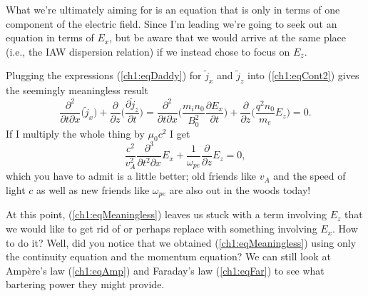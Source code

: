 What we're ultimately aiming for is an equation that is only in terms
of one component of the electric field. Since I'm leading we're going to seek
out an equation in terms of $E_x$, but be aware that we would arrive at the same
place (i.e., the IAW dispersion relation) if we instead chose to focus on $E_z$.

Plugging the expressions (\ref{ch1:eqDaddy}) for $\tilde j_x$ and $\tilde j_z$
into (\ref{ch1:eqCont2}) gives the seemingly meaningless result
\begin{equation*}
    \dfrac{\partial^2}{\partial t \partial x} \Big( \tilde j_x \Big) + \dfrac{\partial}{\partial z}
    \Big( \dfrac{\partial \tilde j_z}{\partial t} \Big) = \dfrac{\partial^2}{\partial
      t \partial x} \Big(\dfrac{m_i n_0 }{B_0^2}\dfrac{\partial E_x}{\partial t} \Big) +
    \dfrac{\partial}{\partial z} \Big( \dfrac{q^2 n_0}{m_e} E_z \Big) = 0.
\end{equation*}
If I multiply the whole thing by $\mu_0 c^2$ I get 
\begin{equation} \label{ch1:eqMeaningless}
  \dfrac{c^2}{v_A^2}\dfrac{\partial^3 }{\partial t^2 \partial x} E_x + \dfrac{1}{\omega_{pe}}\dfrac{\partial}{\partial z} E_z = 0,
\end{equation}
which you have to admit is a little better; old friends like $v_A$ and the speed
of light $c$ as well as new friends like $\omega_{pe}$ are also out in the woods
today!

At this point, (\ref{ch1:eqMeaningless}) leaves us stuck with a term involving
$E_z$ that we would like to get rid of or perhaps replace with something
involving $E_x$. How to do it? Well, did you notice that we obtained
(\ref{ch1:eqMeaningless}) using only the continuity equation and the momentum
equation? We can still look at Amp\`{e}re's law (\ref{ch1:eqAmp}) and Faraday's
law (\ref{ch1:eqFar}) to see what bartering power they might provide.


